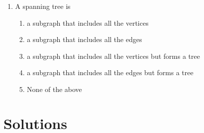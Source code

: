\documentclass[11pt]{article}
\begin{document}
\begin{enumerate}
\item A spanning tree is
\begin{enumerate}
\item a subgraph that includes all the vertices
\item a subgraph that includes all the edges
\item a subgraph that includes all the vertices but forms a tree
\item a subgraph that includes all the edges but forms a tree
\item None of the above
\end{enumerate}
\end{enumerate}


\section{Solutions}
\label{sec:org906e500}
\end{document}
